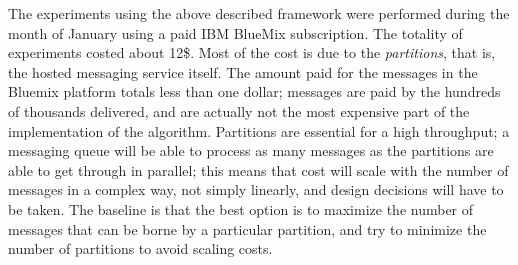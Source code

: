 \documentclass[sigconf]{acmart}
\begin{document}
The experiments using the above described framework were performed
during the month of January using a paid IBM BlueMix subscription. The
totality of experiments costed about 12\$. Most of the cost is due to
the {\em partitions}, that is, the hosted messaging service
itself. The amount paid for the messages in the Bluemix platform
totals less than one dollar; messages are paid by the hundreds of
thousands delivered, and are actually not the most expensive part of the
implementation of the algorithm.
Partitions are
essential for a high throughput; a messaging queue will be able to
process as many messages as the partitions are able to get through in
parallel; this means that cost will scale with the number of messages
in a complex way, not simply linearly, and design decisions will have
to be taken. The baseline is that the best option is to maximize the
number of messages that can be borne by a particular partition, and
try to minimize the number of partitions to avoid scaling costs. 
\end{document}
